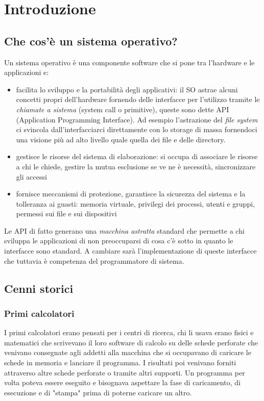 \section{Introduzione}
\subsection{Che cos'è un sistema operativo?}
Un sistema operativo è una componente software che si pone tra l'hardware e le applicazioni e:
\begin{itemize}
    \item facilita lo sviluppo e la portabilità degli applicativi: il SO astrae alcuni concetti propri dell'hardware fornendo delle interfacce per l'utilizzo tramite le \emph{chiamate a sistema} (system call o primitive), queste sono dette API (Application Programming Interface). Ad esempio l'astrazione del \emph{file system} ci svincola dall'interfacciarci direttamente con lo storage di massa fornendoci una visione più ad alto livello quale quella dei file e delle directory.
    
    \item gestisce le risorse del sistema di elaborazione: si occupa di associare le risorse a chi le chiede, gestire la mutua esclusione se ve ne è necessità, sincronizzare gli accessi
    
    \item fornisce meccanismi di protezione, garantisce la sicurezza del sistema e la tolleranza ai guasti: memoria virtuale, privilegi dei processi, utenti e gruppi, permessi sui file e sui dispositivi
\end{itemize}

Le API di fatto generano una \emph{macchina astratta} standard che permette a chi sviluppa le applicazioni di non preoccuparsi di cosa c'è sotto in quanto le interfacce sono standard. A cambiare sarà l'implementazione di queste interfacce che tuttavia è competenza del programmatore di sistema.

\subsection{Cenni storici}

\subsubsection{Primi calcolatori}
I primi calcolatori erano pensati per i centri di ricerca, chi li usava erano fisici e matematici che scrivevano il loro software di calcolo su delle schede perforate che venivano consegnate agli addetti alla macchina che si occupavano di caricare le schede in memoria e lanciare il programma.
I risultati poi venivano forniti attraverso altre schede perforate o tramite altri supporti.
Un programma per volta poteva essere eseguito e bisognava aspettare la fase di caricamento, di esecuzione e di "stampa" prima di poterne caricare un altro.

